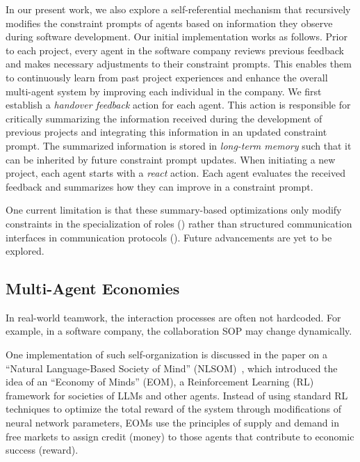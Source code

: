 In our present work, we also explore a self-referential mechanism that recursively modifies the constraint prompts of agents based on information they observe during software development.
Our initial implementation works as follows. Prior to each project, every agent in the software company reviews previous feedback and makes necessary adjustments to their constraint prompts. This enables them to continuously learn from past project experiences and enhance the overall multi-agent system by improving each individual in the company. We first establish a \textit{handover feedback} action for each agent. This action is responsible for critically summarizing the information received during the development of previous projects and integrating this information in an updated constraint prompt. The summarized information is stored in \textit{long-term memory} such that it can be inherited by future constraint prompt updates. 
When initiating a new project, each agent starts with a \textit{react} action. Each agent evaluates the received feedback and summarizes how they can improve in a constraint prompt.


One current limitation is that these summary-based optimizations only modify constraints in the specialization of roles  () rather than structured communication interfaces in communication protocols (). Future advancements are yet to be explored.

\subsection{Multi-Agent Economies}
In real-world teamwork, the interaction processes are often not hardcoded. 
For example, in a software company, the collaboration SOP may change dynamically.

One implementation of such self-organization is discussed in the paper on a ``Natural Language-Based Society of Mind'' (NLSOM)~\citep{zhuge2023mindstorms}, which introduced the idea of an ``Economy of Minds'' (EOM), a Reinforcement Learning (RL) framework for societies of LLMs and other agents. Instead of using standard RL techniques to optimize the total reward of the system through modifications of neural network parameters, EOMs use the principles of supply and demand in free markets to assign credit (money) to those agents that contribute to economic success (reward). 

